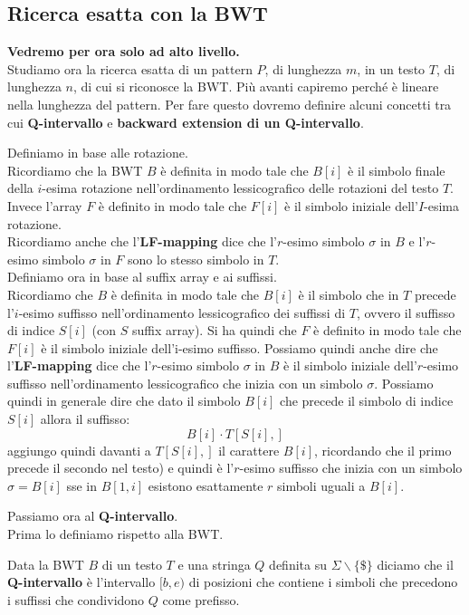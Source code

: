 \documentclass[a4paper,12pt, oneside]{book}
\begin{document}
\subsection{Ricerca esatta con la BWT}
\textbf{Vedremo per ora solo ad alto livello.}\\
Studiamo ora la ricerca esatta di un pattern $P$, di lunghezza $m$, in un testo
$T$, di lunghezza $n$, di cui si riconosce la BWT. Più avanti capiremo perché è
lineare nella lunghezza del pattern. Per fare questo dovremo
definire alcuni concetti tra cui \textbf{Q-intervallo} e \textbf{backward
  extension di un Q-intervallo}.\\
\begin{shaded}
  Definiamo in base alle rotazione.\\
  Ricordiamo che la BWT $B$ è definita in modo tale che $B[i]$ è il simbolo
  finale 
  della $i$-esima rotazione nell'ordinamento lessicografico delle rotazioni del
  testo $T$. Invece l'array $F$ è definito in modo tale che $F[i]$ è il simbolo
  iniziale dell'$I$-esima rotazione.\\
  Ricordiamo anche che l'\textbf{LF-mapping} dice che l'$r$-esimo simbolo
  $\sigma$ 
  in $B$ e l'$r$-esimo simbolo $\sigma$ in $F$ sono lo stesso simbolo in $T$.\\
  Definiamo ora in base al suffix array e ai suffissi.\\
  Ricordiamo che $B$ è definita in modo tale che $B[i]$ è il simbolo che
  in 
  $T$ precede l'$i$-esimo suffisso nell'ordinamento lessicografico dei suffissi
  di 
  $T$, ovvero il suffisso di indice $S[i]$ (con $S$ suffix array). Si ha quindi
  che $F$ è definito in  
  modo tale che $F[i]$ è il simbolo iniziale dell’i-esimo suffisso. Possiamo
  quindi anche dire che l'\textbf{LF-mapping} dice che l'$r$-esimo simbolo
  $\sigma$ in $B$ è il simbolo iniziale dell'$r$-esimo suffisso nell'ordinamento
  lessicografico che inizia con un simbolo $\sigma$. Possiamo quindi in generale
  dire che dato il simbolo $B[i]$ che precede il simbolo di indice $S[i]$ allora
  il suffisso:
  \[B[i]\cdot T[S[i],]\]
  aggiungo quindi davanti a $T[S[i],]$ il carattere $B[i]$, ricordando che il
  primo precede il secondo nel testo) e quindi
  è l'$r$-esimo suffisso che inizia con un simbolo $\sigma=B[i]$ sse in $B[1,i]$
  esistono esattamente $r$ simboli uguali a $B[i]$.
\end{shaded}
Passiamo ora al \textbf{Q-intervallo}.\\
Prima lo definiamo rispetto alla BWT.
\begin{definizione}
  Data la BWT $B$ di un testo $T$ e una stringa $Q$ definita su
  $\Sigma\backslash\{\$\}$ diciamo che il \textbf{Q-intervallo} è l'intervallo
  $[b,e)$ di posizioni che contiene i simboli che precedono i suffissi che
  condividono $Q$ come prefisso.
\end{definizione}
\end{document}
